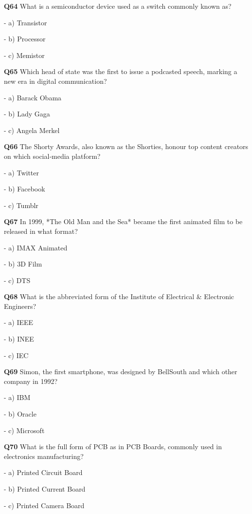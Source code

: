 \textbf{Q64} What is a semiconductor device used as a switch commonly known as?\par
\quad - a) Transistor\par
\quad - b) Processor\par
\quad - c) Memistor\par

\textbf{Q65} Which head of state was the first to issue a podcasted speech, marking a new era in digital communication?\par
\quad - a) Barack Obama\par
\quad - b) Lady Gaga\par
\quad - c) Angela Merkel\par

\textbf{Q66} The Shorty Awards, also known as the Shorties, honour top content creators on which social‑media platform?\par
\quad - a) Twitter\par
\quad - b) Facebook\par
\quad - c) Tumblr\par

\textbf{Q67} In 1999, *The Old Man and the Sea* became the first animated film to be released in what format?\par
\quad - a) IMAX Animated\par
\quad - b) 3D Film\par
\quad - c) DTS\par

\textbf{Q68} What is the abbreviated form of the Institute of Electrical & Electronic Engineers?\par
\quad - a) IEEE\par
\quad - b) INEE\par
\quad - c) IEC\par

\textbf{Q69} Simon, the first smartphone, was designed by BellSouth and which other company in 1992?\par
\quad - a) IBM\par
\quad - b) Oracle\par
\quad - c) Microsoft\par

\textbf{Q70} What is the full form of PCB as in PCB Boards, commonly used in electronics manufacturing?\par
\quad - a) Printed Circuit Board\par
\quad - b) Printed Current Board\par
\quad - c) Printed Camera Board\par

 